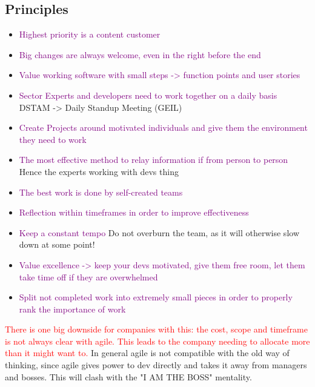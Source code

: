 \documentclass[main.tex,fontsize=12pt,paper=a4,paper=landscape,DIV=calc,]{scrartcl}
\begin{document}
\begin{multicols*}{2}
\subsection{Principles}
\begin{itemize}
\item \textcolor{purple}{Highest priority is a content customer}\newline
\item \textcolor{purple}{Big changes are always welcome, even in the right before the end}
\item \textcolor{purple}{Value working software with small steps -> function points and user stories}
\item \textcolor{purple}{Sector Experts and developers need to work together on a daily basis}\newline
  DSTAM -> Daily Standup Meeting (GEIL)
\item \textcolor{purple}{Create Projects around motivated individuals and give them the environment they need to work}
\item \textcolor{purple}{The most effective method to relay information if from person to person}\newline
  Hence the experts working with devs thing
\item \textcolor{purple}{The best work is done by self-created teams}
\item \textcolor{purple}{Reflection within timeframes in order to improve effectiveness}
\item \textcolor{purple}{Keep a constant tempo}\newline
  Do not overburn the team, as it will otherwise slow down at some point!
\item \textcolor{purple}{Value excellence -> keep your devs motivated, give them free room, let them take time off if they are overwhelmed}
\item \textcolor{purple}{Split not completed work into extremely small pieces in order to properly rank the importance of work}
\end{itemize} 
\textcolor{red}{There is one big downside for companies with this: the cost, scope and timeframe is not always clear with agile.\newline
This leads to the company needing to allocate more than it might want to.}\newline
In general agile is not compatible with the old way of thinking, since agile gives power to dev directly and takes it away from managers and bosses.\newline
This will clash with the "I AM THE BOSS" mentality.



\end{multicols*}
\end{document}
